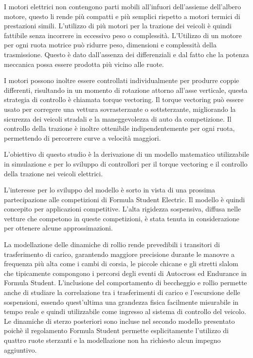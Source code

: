 \sommarioITA
I motori elettrici non contengono parti mobili all'infuori dell'assieme dell'albero motore, questo li rende più compatti e più semplici rispetto a motori termici di prestazioni simili. L'utilizzo di più motori per la trazione dei veicoli è quindi fattibile senza incorrere in eccessivo peso o complessità. L'Utilizzo di un motore per ogni ruota motrice può ridurre peso, dimensioni e complessità della trasmissione. Questo è dato dall'assenza dei differenziali e dal fatto che la potenza meccanica possa essere prodotta più vicino alle ruote.

I motori possono inoltre essere controllati individualmente per produrre coppie differenti, risultando in un momento di rotazione attorno all'asse verticale, questa strategia di controllo è chiamata torque vectoring.
Il torque vectoring può essere usato per corregere una vettura sovrasterzante o sottsterzante, migliorando la sicurezza dei veicoli stradali e la maneggevolezza di auto da competizione.
Il controllo della trazione è inoltre ottenibile indipendentemente per ogni ruota, permettendo di percorrere curve a velocità maggiori.

L'obiettivo di questo studio è la derivazione di un modello matematico utilizzabile in simulazione e per lo sviluppo di controllori per il torque vectoring e il controllo della trazione nei veicoli elettrici.

L'interesse per lo sviluppo del modello è sorto in vista di una prossima partecipazione alle competizioni di Formula Student Electric. Il modello è quindi concepito per applicazioni competitive. L'alta rigidezza sospensiva, diffusa nelle vetture che competono in queste competizioni, è stata tenuta in considerazione per ottenere alcune approssimazioni.

La modellazione delle dinamiche di rollio rende prevedibili i transitori di trasferimento di carico, garantendo maggiore precisione durante le manovre a frequenza più alta come i cambi di corsia, le piccole chicane e gli stretti slalom che tipicamente compongono i percorsi degli eventi di Autocross ed Endurance in Formula Student.
L'inclusione del comportamento di beccheggio e rollio permette anche di studiare la correlazione tra i trasferimenti di carico e l'escursione delle sospensioni, essendo quest'ultima una grandezza fisica facilmente misurabile in tempo reale e quindi utilizzabile come ingresso al sistema di controllo del veicolo.
Le dinamiche di sterzo posteriori sono incluse nel secondo modello presentato poichè il regolamento Formula Student permette esplicitamente l'utilizzo di quattro ruote sterzanti e la modellazione non ha richiesto alcun impegno aggiuntivo.

